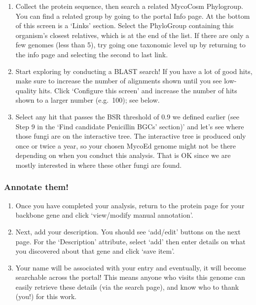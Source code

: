 \documentclass[
  letterpaper,
  DIV=11,
  numbers=noendperiod]{scrreprt}
\providecommand{\tightlist}{%
  \setlength{\itemsep}{0pt}\setlength{\parskip}{0pt}}
\begin{document}
\begin{enumerate}
  Hovering your mouse over the genes in the cartoon will provide
  information on those proteins. Pick a cluster and repeat our previous
  exercise to characterize its distribution. You can start by clicking
  on the backbone gene in the cartoon, which will bring you to the
  corresponding protein page. Keep this page open in a separate tab for
  the rest of the exercise, we will revisit it later.
\item
  Collect the protein sequence, then search a related MycoCosm
  Phylogroup. You can find a related group by going to the portal Info
  page. At the bottom of this screen is a `Links' section. Select the
  PhyloGroup containing this organism's closest relatives, which is at
  the end of the list. If there are only a few genomes (less than 5),
  try going one taxonomic level up by returning to the info page and
  selecting the second to last link.
\item
  Start exploring by conducting a BLAST search! If you have a lot of
  good hits, make sure to increase the number of alignments shown until
  you see low-quality hits. Click `Configure this screen' and increase
  the number of hits shown to a larger number (e.g.~100); see below.
\item
  Select any hit that passes the BSR threshold of 0.9 we defined earlier
  (see Step 9 in the `Find candidate Penicillin BGCs' section)' and
  let's see where those fungi are on the interactive tree. The
  interactive tree is produced only once or twice a year, so your chosen
  MycoEd genome might not be there depending on when you conduct this
  analysis. That is OK since we are mostly interested in where these
  other fungi are found.
\end{enumerate}

\subsubsection*{Annotate them!}\label{annotate-them}

\begin{enumerate}
\def\labelenumi{\arabic{enumi}.}
\tightlist
\item
  Once you have completed your analysis, return to the protein page for
  your backbone gene and click `view/modify manual annotation'.
\item
  Next, add your description. You should see `add/edit' buttons on the
  next page. For the `Description' attribute, select `add' then enter
  details on what you discovered about that gene and click `save item'.
\item
  Your name will be associated with your entry and eventually, it will
  become searchable across the portal! This means anyone who visits this
  genome can easily retrieve these details (via the search page), and
  know who to thank (you!) for this work.
\end{enumerate}
\end{document}
